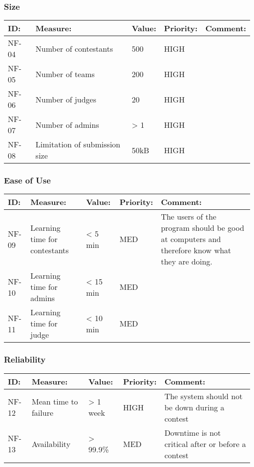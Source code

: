 \subsubsection{Size}
\begin{supertabular}{|l|p{5cm}|p{1.8cm}|l|p{4.4cm}|}
\hline
\textbf{ID:} & \textbf{Measure:} & \textbf{Value:} & \textbf{Priority:} & \textbf{Comment:}\\
\hline
NF-04 & Number of contestants & 500 & HIGH &
\\\hline

NF-05 & Number of teams & 200 & HIGH & \\
\hline

NF-06 & Number of judges & 20 & HIGH & \\
\hline

NF-07 & Number of admins & {\textgreater} 1 & HIGH & \\
\hline

NF-08 & Limitation of submission size & 50kB & HIGH \\
\hline
\end{supertabular}

\subsubsection{Ease of Use}

\begin{supertabular}{|l|p{5cm}|p{1.8cm}|l|p{4.4cm}|}
\hline
\textbf{ID:} & \textbf{Measure:} & \textbf{Value:} & \textbf{Priority:} & \textbf{Comment:}\\
\hline
NF-09 & Learning time for contestants & {\textless} 5 min & MED & The users of
the program should be good at computers and therefore know what they are
doing.\\
\hline

NF-10 & Learning time for admins & {\textless} 15 min & MED &
\\\hline

NF-11 &
Learning time for judge &
{\textless} 10 min &
MED &
\\\hline

\end{supertabular}
\subsubsection{Reliability}
\begin{supertabular}{|l|p{5cm}|p{1.8cm}|l|p{4.4cm}|}
\hline
\textbf{ID:} & \textbf{Measure:} & \textbf{Value:} & \textbf{Priority:} & \textbf{Comment:}\\
\hline

NF-12 & Mean time to failure & {\textgreater} 1 week & HIGH & The system should
not be down during a contest\\
\hline

NF-13 & Availability & {\textgreater} 99.9\% & MED & Downtime is not critical
after or before a contest \\
\hline
\end{supertabular}

